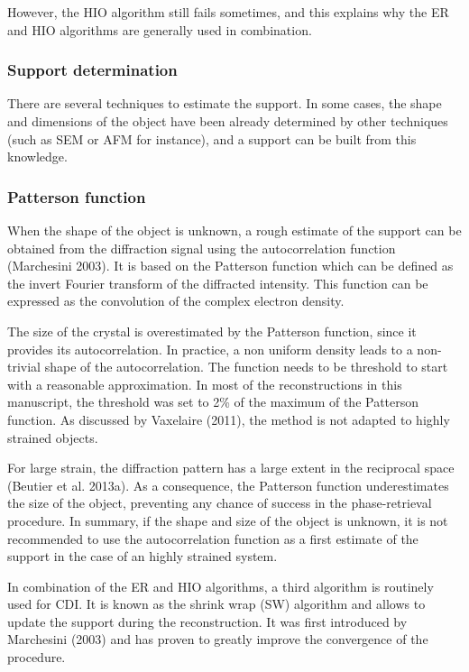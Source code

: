 However, the HIO algorithm still fails sometimes, and this explains why the ER and HIO algorithms are generally used in combination.

\subsubsection{Support determination}
There are several techniques to estimate the support. In some cases, the shape and dimensions of the object have been already determined by other techniques (such as SEM or AFM for instance), and a support can be built from this knowledge. 

\subsubsection{Patterson function}
When the shape of the object is unknown, a rough estimate of the support can be obtained from the diffraction signal using the autocorrelation function (Marchesini 2003). It is based on the Patterson function which can be defined as the invert Fourier transform of the diffracted intensity. This function can be expressed as the convolution of the complex electron density.

The size of the crystal is overestimated by the Patterson function, since it provides its autocorrelation. In practice, a non uniform density leads to a non-trivial shape of the autocorrelation. The function needs to be threshold to start with a reasonable approximation. In most of the reconstructions in this manuscript, the threshold was set to 2\% of the maximum of the Patterson function. As discussed by Vaxelaire (2011), the method is not adapted to highly strained objects.


For large strain, the diffraction pattern has a large extent in the reciprocal space
(Beutier et al. 2013a). As a consequence, the Patterson function underestimates the size of the object, preventing any chance of success in the phase-retrieval procedure. In summary, if the shape and size of the object is unknown, it is not recommended to use the autocorrelation function as a first estimate of the support in the case of an highly strained system.

In combination of the ER and HIO algorithms, a third algorithm is routinely used for CDI. It is known as the shrink wrap (SW) algorithm and allows to update the support during the reconstruction. It was first introduced by Marchesini (2003) and has proven to greatly improve the convergence of the procedure.

